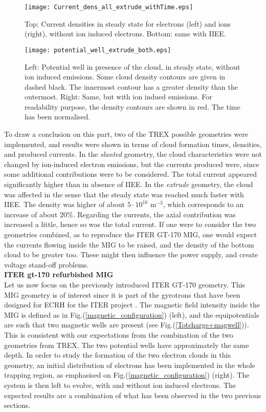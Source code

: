 \begin{figure}[h!]
\centering
	\texttt{[image: Current\_dens\_all\_extrude\_withTime.eps]}
	\caption{\label{Current_dens_all_extrude}Top: Current densities in steady state for electrons (left) and ions (right), without ion induced electrons. Bottom: same with IIEE. }
\end{figure}


\begin{figure}[h!]
\centering
	\texttt{[image: potential\_well\_extrude\_both.eps]}
	\caption{\label{potential_well_extrude_both} Left: Potential well in presence of the cloud, in steady state, without ion induced emissions. Some cloud density contours are given in dashed black. The innermost contour has a greater density than the outermost. Right: Same, but with ion indued emissions. For readability purpose, the density contours are shown in red. The time has been normalised.}
\end{figure}

To draw a conclusion on this part, two of the TREX possible geometries were implemented, and results were shown in terms of cloud formation times, densities, and produced currents. In the \emph{slanted} geometry, the cloud characteristics were not changed by ion-induced electron emissions, but the currents produced were, since some additional contributions were to be considered. The total current appeared significantly higher than in absence of IIEE. In the \emph{extrude} geometry, the cloud was affected in the sense that the steady state was reached much faster with IIEE. The density was higher of about $5\cdot 10^{16}$ m$^{-3}$, which corresponds to an increase of about 20\%. Regarding the currents, the axial contribution was increased a little, hence so was the total current. If one were to consider the two geometries combined, as to reproduce the ITER GT-170 MIG, one would expect the currents flowing inside the MIG to be raised, and the density of the bottom cloud to be greater too. These might then influence the power supply, and create voltage stand-off problems.\\ 

\newpage
\textbf{ITER gt-170 refurbished MIG}\\

Let us now focus on the previously introduced ITER GT-170 geometry. This MIG geometry is of interest since it is part of the gyrotrons that have been designed for ECRH for the ITER project \cite{}. The magnetic field intensity inside the MIG is defined as in Fig.(\ref{magnetic_configuration}) (left), and the equipotentials are such that two magnetic wells are present (see Fig.(\ref{Totcharge+magwell})). This is consistent with our expectations from the combination of the two geometries from TREX. The two potential wells have approximately the same depth. In order to study the formation of the two electron clouds in this geometry, an initial distribution of electrons has been implemented in the whole trapping region, as emphasised on Fig.(\ref{magnetic_configuration}) (right). The system is then left to evolve, with and without ion induced electrons. The expected results are a combination of what has been observed in the two previous sections.\\

